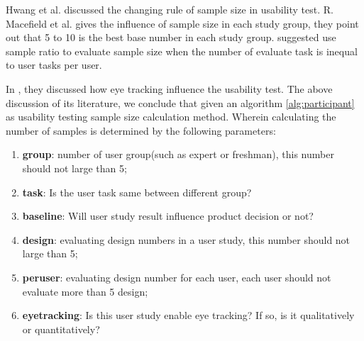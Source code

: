 Hwang et al.\cite{Hwang:2010:NPR:1735223.1735255} discussed the changing rule of sample size in usability test. R. Macefield et al.\cite{Macefield:2009:SPG:2835425.2835429} gives the influence of sample size in each study group, they point out that 5 to 10 is the best base number in each study group.
\cite{medlock2002using} suggested use sample ratio to evaluate sample size when the number of evaluate task is inequal to user tasks per user.

In \cite{pernice2009eyetracking}, they discussed how eye tracking influence the usability test. The above discussion of its literature, we conclude that given an algorithm \ref{alg:participant} as usability testing sample size calculation method. Wherein calculating the number of samples is determined by the following parameters:
\begin{enumerate}
    \kaishu
    \item \textbf{group}: number of user group(such as expert or freshman), this number should not large than 5;
    \item \textbf{task}: Is the user task same between different group?
    \item \textbf{baseline}: Will user study result influence product decision or not?
    \item \textbf{design}: evaluating design numbers in a user study, this number should not large than 5;
    \item \textbf{peruser}: evaluating design number for each user, each user should not evaluate more than 5 design;
    \item \textbf{eyetracking}: Is this user study enable eye tracking? If so, is it qualitatively or quantitatively?
\end{enumerate}

